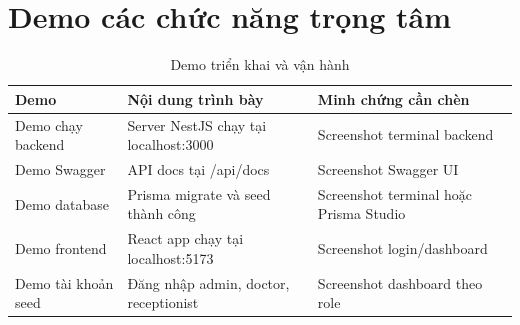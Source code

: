 \section{Demo các chức năng trọng tâm}

\begin{longtable}{|p{3.2cm}|p{5.2cm}|p{5.5cm}|}
\caption{Demo triển khai và vận hành}\\
\hline
\textbf{Demo} & \textbf{Nội dung trình bày} & \textbf{Minh chứng cần chèn} \\
\hline
Demo chạy backend & Server NestJS chạy tại localhost:3000 & Screenshot terminal backend \\
\hline
Demo Swagger & API docs tại /api/docs & Screenshot Swagger UI \\
\hline
Demo database & Prisma migrate và seed thành công & Screenshot terminal hoặc Prisma Studio \\
\hline
Demo frontend & React app chạy tại localhost:5173 & Screenshot login/dashboard \\
\hline
Demo tài khoản seed & Đăng nhập admin, doctor, receptionist & Screenshot dashboard theo role \\
\hline
\end{longtable}

